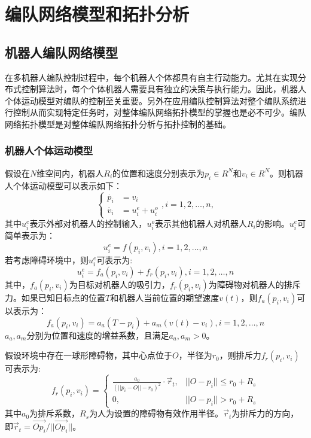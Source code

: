 

\chapter{编队网络模型和拓扑分析}
\label{chap:2}

\section{机器人编队网络模型}
在多机器人编队控制过程中，每个机器人个体都具有自主行动能力。尤其在实现分布式控制算法时，每个个体机器人需要具有独立的决策与执行能力。因此，机器人个体运动模型对编队的控制至关重要。另外在应用编队控制算法对整个编队系统进行控制从而实现特定任务时，对整体编队网络拓扑模型的掌握也是必不可少。编队网络拓扑模型是对整体编队网络拓扑分析与拓扑控制的基础\supercite{张飞2010}。

\subsection{机器人个体运动模型}
假设在$N$维空间内，机器人$R_i$的位置和速度分别表示为$p_i \in R^N$和$v_i \in R^N$。则机器人个体运动模型可以表示如下：
\begin{equation}
	\left\{
	\begin{aligned}
		\dot{p_i} & = v_i \\
		\dot{v_i} & = u_i^e + u_i^o
	\end{aligned}
	, i=1,2,\dots,n,
	\right.
\end{equation}
其中$u_i^e$表示外部对机器人的控制输入，$u_i^o$表示其他机器人对机器人$R_i$的影响。$u_i^e$可简单表示为：
\begin{equation}
	u_i^e = f(p_i,v_i), i=1,2,\dots,n
\end{equation}
若考虑障碍环境中，则$u_i^e$可表示为:
\begin{equation}
	\label{eq:outside_control}
	u_i^e = f_a(p_i,v_i) + f_r(p_i,v_i), i=1,2,\dots,n
\end{equation}
其中，$f_a(p_i,v_i)$为目标对机器人的吸引力，$f_r(p_i,v_i)$为障碍物对机器人的排斥力。如果已知目标点的位置$T$和机器人当前位置的期望速度$v(t)$，则$f_a(p_i,v_i)$可以表示为：
\begin{equation}
	\label{eq:object_control}
	f_a(p_i,v_i) = a_a(T-p_i) + a_m(v(t)-v_i), i=1,2,\dots,n
\end{equation}
$a_a,a_m$分别为位置和速度的增益系数，且满足$a_a,a_m > 0$。

假设环境中存在一球形障碍物，其中心点位于$O$，半径为$r_0$，则排斥力$f_r(p_i,v_i)$可表示为:
\begin{equation}
	f_r(p_i,v_i) = \begin{cases}
		\frac{a_0}{{(\lvert\lvert p_i-O \rvert\rvert -r_0)}^2} \cdot \vec{r}_t, & \lvert\lvert O-p_i \rvert\rvert \leq r_0 + R_s \\
		0, &  \lvert\lvert O-p_i \rvert\rvert > r_0 + R_s
	\end{cases}
\end{equation}
其中$a_0$为排斥系数，$R_s$为人为设置的障碍物有效作用半径。$\vec{r}_t$为排斥力的方向，即$\vec{r}_t = \vec{Op_i}/\lvert\lvert\vec{Op_i}\rvert\rvert$。
